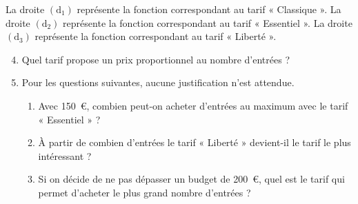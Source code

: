 \documentclass[exercice,a4]{thedocument}%
\begin{document}
La droite $(\mathrm{d}_1)$ représente la fonction correspondant au tarif
« Classique ». La droite $(\mathrm{d}_2)$ représente la fonction
correspondant au tarif « Essentiel ». La droite $(\mathrm{d}_3)$ représente
la fonction correspondant au tarif « Liberté ».

\begin{enumerate}
    \setcounter{enumi}{3}
    \item Quel tarif propose un prix proportionnel au nombre d'entrées ?
    \item Pour les questions suivantes, aucune justification n'est attendue.
    \begin{enumerate}
        \item Avec 150~\euro, combien peut-on acheter d'entrées au maximum
        avec le tarif « Essentiel » ?
        \item À partir de combien d'entrées le tarif « Liberté » devient-il
        le tarif le plus intéressant ?
        \item Si on décide de ne pas dépasser un budget de 200~\euro, quel
        est le tarif qui permet d'acheter le plus grand nombre d'entrées ?
    \end{enumerate}
\end{enumerate}
\showthesource
\end{document}
